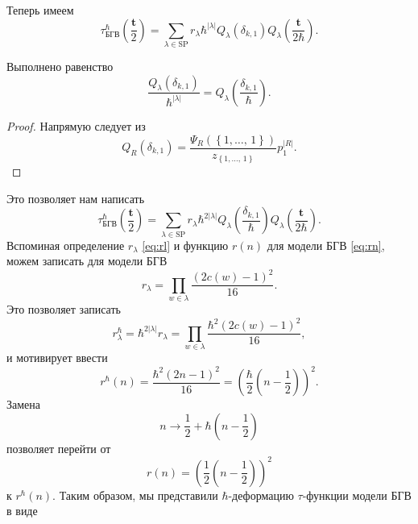 \documentclass[a5paper,twoside]{article}
\numberwithin{equation}{section}
\begin{document}
Теперь имеем
\begin{equation}
	\tau^\hbar _{\text{БГВ}}\left( \frac{\mathbf{t}}{2} \right) =\sum_{\lambda \in \mathrm{SP}}
	r_\lambda \hbar ^{|\lambda|}Q_\lambda\left( \delta_{k,1} \right) Q_\lambda\left( \frac{\mathbf{t} }{2\hbar } \right) 
.\end{equation}
\begin{stm*}

Выполнено равенство
\begin{equation}
	\frac{Q_{\lambda}\left( \delta_{k,1} \right) 
}{\hbar ^{|\lambda|}}= Q_\lambda \left( \frac{\delta_{k,1}}{\hbar } \right)  .\end{equation} 
\end{stm*}
\begin{proof}
Напрямую следует из 
\[
	Q_R\left( \delta_{k,1} \right) =
	\frac{\Psi_R\left( \left\{ 1,\ldots,\,1 \right\}  \right) }{z_{\left\{ 1,\ldots,\,1 \right\} }}p_1^{|R|}
.\] 
\end{proof}
Это позволяет нам написать
\begin{equation}
	\tau^\hbar _{\text{БГВ}}\left( \frac{\mathbf{t}}{2} \right) =\sum_{\lambda \in \mathrm{SP}}
	r_\lambda \hbar ^{2|\lambda|}Q_\lambda\left( \frac{\delta_{k,1}}{\hbar } \right) Q_\lambda\left( \frac{\mathbf{t} }{2\hbar } \right) 
.\end{equation}
Вспоминая определение $r_\lambda$ \eqref{eq:rl} и функцию
$r(n)$ для модели БГВ  \eqref{eq:rn}, можем
записать для модели БГВ
\begin{equation}
	r_\lambda= \prod_{w \in \lambda}^{} \frac{(2c(w)-1)^2}{16} 
.\end{equation} 
Это позволяет записать
\begin{equation}
r_\lambda^\hbar =\hbar ^{2|\lambda|}r_\lambda=\prod_{w \in \lambda}^{} 
\frac{\hbar ^2 \left( 2c(w)-1 \right) ^2}{16}
,\end{equation} 
и мотивирует ввести
\begin{equation}
	r^\hbar(n) = \frac{\hbar ^2 (2n-1)^2}{16}=
	\left( \frac{\hbar}{2}\left( n-\frac{1}{2} \right)  \right) ^2
.\end{equation} 
Замена
\begin{equation}
	n\to \frac{1}{2}+ \hbar \left( n-\frac{1}{2} \right) 
\end{equation} 
позволяет перейти от 
\begin{equation}
	r(n)=\left( \frac{1}{2}\left( n-\frac{1}{2} \right)  \right) ^2
\end{equation} 
к $r^\hbar (n)$. Таким образом, мы представили  $\hbar $-деформацию $\tau$-функции модели БГВ в виде
\end{document}
